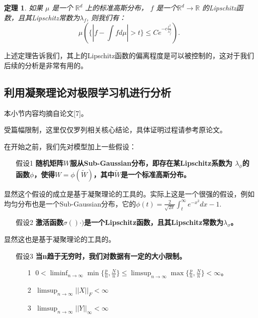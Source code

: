 \documentclass[UTF8,12pt]{ctexart}
\newtheorem{theorem}{定理}
\begin{document}
\begin{theorem}\label{Thm0}
    如果 $\mu$ 是一个 $\mathbb{R}^d$ 上的标准高斯分布， $f$ 是一个$\mathbb{R}^d \rightarrow \mathbb{R}$ 的Lipschitz函数，且其Lipschitz常数为$\lambda_f$, 则我们有：
    \begin{equation}
        \mu(\{|f - \int fd\mu| > t\} \le Ce^{-c\frac{t^2}{\lambda_f^2}}).
    \end{equation}
\end{theorem}

上述定理告诉我们，其上的Lipschitz函数的偏离程度是可以被控制的，这对于我们后续的分析是非常有用的。

\subsection{利用凝聚理论对极限学习机进行分析}

本小节内容均摘自论文[7]。

受篇幅限制，这里仅仅罗列相关核心结论，具体证明过程请参考原论文。

在开始之前，我们先对模型加上一些假设：

\begin{itemize}
    \item[假设1 ] \textbf{随机矩阵$W$服从Sub-Gaussian分布，即存在某Lipschitz系数为
    $\lambda_\phi$的函数$\phi$，使得$W = \phi(\tilde W)$，其中$\tilde W$是一个标准高斯分布。}
\end{itemize}

显然这个假设的成立是基于凝聚理论的工具的。实际上这是一个很强的假设，例如均匀分布也是一个Sub-Gaussian分布，它的$\phi(t) = \frac{2}{\sqrt{2\pi}}\int_t^\infty e^{-x^2}dx - 1$.

\begin{itemize}
    \item[假设2 ] \textbf{激活函数$\sigma()\cdot)$是一个Lipschitz函数，且其Lipschitz常数为$\lambda_\sigma$。}
\end{itemize}

显然这也是基于凝聚理论的工具的。

\begin{itemize}
    \item[假设3 ] \textbf{当n趋于无穷时，我们对数据有一定的大小限制。}
    \begin{itemize}
        \item[\textcircled{1}] $0 < \liminf_{n \rightarrow \infty} \min{\{\frac{p}{n}, \frac{N}{n}\}} \le \limsup_{n \rightarrow \infty} \max{\{\frac{p}{n}, \frac{N}{n}\}} < \infty$。
        \item[\textcircled{2}] $\limsup_{n \rightarrow \infty} ||X||_F < \infty$
        \item[\textcircled{3}] $\limsup_{n \rightarrow \infty} ||Y||_{\infty} < \infty$
    \end{itemize}
\end{itemize}
\end{document}

